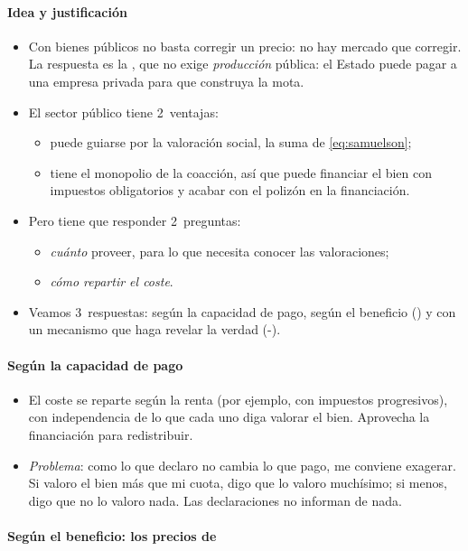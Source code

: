 \documentclass[11pt]{article}
\begin{document}
\paragraph{Idea y justificación}
\begin{itemize}
\item Con bienes públicos no basta corregir un precio: no hay mercado que corregir. La respuesta es la , que no exige \emph{producción} pública: el Estado puede pagar a una empresa privada para que construya la mota.
\item El sector público tiene 2~ventajas:
  \begin{itemize}
  \item puede guiarse por la valoración social, la suma de \eqref{eq:samuelson};
  \item tiene el monopolio de la coacción, así que puede financiar el bien con impuestos obligatorios y acabar con el polizón en la financiación.
  \end{itemize}
\item Pero tiene que responder 2~preguntas:
  \begin{itemize}
  \item \emph{cuánto} proveer, para lo que necesita conocer las valoraciones;
  \item \emph{cómo repartir el coste}.
  \end{itemize}
\item Veamos 3~respuestas: según la capacidad de pago, según el beneficio () y con un mecanismo que haga revelar la verdad (-).
\end{itemize}

\paragraph{Según la capacidad de pago}
\begin{itemize}
\item El coste se reparte según la renta (por ejemplo, con impuestos progresivos), con independencia de lo que cada uno diga valorar el bien. Aprovecha la financiación para redistribuir.
\item \emph{Problema}: como lo que declaro no cambia lo que pago, me conviene exagerar. Si valoro el bien más que mi cuota, digo que lo valoro muchísimo; si menos, digo que no lo valoro nada. Las declaraciones no informan de nada.
\end{itemize}

\paragraph{Según el beneficio: los precios de }
\end{document}
